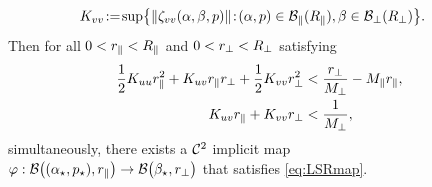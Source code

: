 \documentclass[a4paper]{cas-dc}
\begin{document}
\begin{theorem}
\begin{align}
        \Kvv & \!:=\! \sup\bigl\{\norm{\zvv[p]} \!:\! (\A,p) \in \Bpr[\Rpr], \B \in \Bpp[\Rpp]\bigr\}.
        \label{def:lsr2-K}
    \end{align}
    Then for all \(0 < \rpr < \Rpr\) and \(0 < \rpp < \Rpp\) satisfying
    \begin{subequations}
        \begin{align}
            \frac12\Kuu\rpr^2 + \Kuv\rpr\rpp + \frac12\Kvv\rpp^2 & < \frac{\rpp}{\Mpp} - \Mpr\rpr, \label{eq:lsr2.1} \\
            \Kuv\rpr + \Kvv\rpp                                  & < \frac{1}{\Mpp}, \label{eq:lsr2.2}
        \end{align} \label{eq:lsr2}
    \end{subequations}
    simultaneously, there exists a \(\C[2]\) implicit map \\ \(\varphi : \Bpara[\rpr] \to \Bperp[\rpp]\) that satisfies \eqref{eq:LSRmap}.
\end{theorem}
\end{document}
